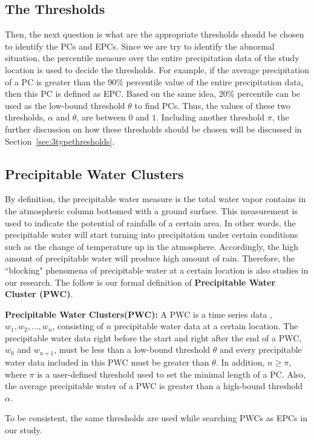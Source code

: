 \documentclass{acm_proc_article-sp}
\begin{document}
\subsection{The Thresholds}
\label{sec:Thresholds}
Then, the next question is what are the appropriate thresholds should be chosen to identify the PCs and EPCs. Since we are try to identify the abnormal situation, the percentile measure over the entire precipitation data of the study location is used to decide the thresholds. For example, if the average precipitation of a PC is greater than the 90\% percentile value of the entire precipitation data, then this PC is defined as EPC. Based on the same idea, 20\% percentile can be used as the low-bound threshold $\theta$ to find PCs.
Thus, the values of these two thresholds, $\alpha$ and $\theta$, are between $0$ and $1$. Including another threshold $\pi$, the further discussion on how these thresholds should be chosen will be discussed in Section~\ref{sec:3typethresholds}.      

\subsection{Precipitable Water Clusters}
\label{sec:PWC}
By definition, the precipitable water measure is the total water vapor contains in the atmospheric column bottomed with a ground surface. This measurement is used to indicate the potential of rainfalls of a certain area. In other words, the precipitable water will start turning into precipitation under certain conditions such as the change of temperature up in the atmosphere. \cite{king2003cloud} Accordingly, the high amount of precipitable water will produce high amount of rain. 
\newline Therefore, the ``blocking" phenomena of precipitable water at a certain location is also studies in our research. The follow is our formal definition of \textbf{Precipitable Water Cluster (PWC)}. 
\begin{mydef} 
\label{def:PWC}
\textbf{Precipitable Water Clusters(PWC):} A PWC is a time series data , $w_1 , w_2 ,
\ldots , w_n $, consisting of $n$ precipitable water data at a certain location. The
precipitable water data right before the start and right after the end of a PWC, $w_0$
and $w_{n+1}$, must be less than a low-bound threshold $\theta$ and every
precipitable water data included in this PWC must be greater than $\theta$. In
addition, $n \geq \pi $, where $\pi $ is a user-defined threshold used to set
the minimal length of a PC. Also, the average precipitable water of a PWC is greater than a high-bound threshold $\alpha$.
\end{mydef} 
To be consistent, the same thresholds are used while searching PWCs as EPCs in our study.
\end{document}

